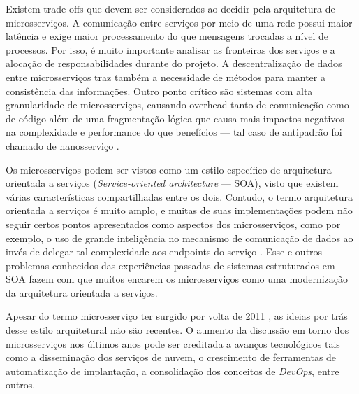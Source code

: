 Existem trade-offs que devem ser considerados ao decidir pela arquitetura de microsserviços. A comunicação entre serviços por meio de uma rede possui maior latência e exige maior processamento do que mensagens trocadas a nível de processos. Por isso, é muito importante analisar as fronteiras dos serviços e a alocação de responsabilidades durante do projeto. A descentralização de dados entre microsserviços traz também a necessidade de métodos para manter a consistência das informações. Outro ponto crítico são sistemas com alta granularidade de microsserviços, causando overhead tanto de comunicação como de código além de uma fragmentação lógica que causa mais impactos negativos na complexidade e performance do que benefícios --- tal caso de antipadrão foi chamado de nanosserviço \cite{rotem}.

Os microsserviços podem ser vistos como um estilo específico de arquitetura orientada a serviços (\textit{Service-oriented architecture} --- SOA), visto que existem várias características compartilhadas entre os dois. Contudo, o termo arquitetura orientada a serviços é muito amplo, e muitas de suas implementações podem não seguir certos pontos apresentados como aspectos dos microsserviços, como por exemplo, o uso de grande inteligência no mecanismo de comunicação de dados ao invés de delegar tal complexidade aos endpoints do serviço \cite{james}. Esse e outros problemas conhecidos das experiências passadas de sistemas estruturados em SOA fazem com que muitos encarem os microsserviços como uma modernização da arquitetura orientada a serviços.

Apesar do termo microsserviço ter surgido por volta de 2011 \cite{james}, as ideias por trás desse estilo arquitetural não são recentes. O aumento da discussão em torno dos microsserviços nos últimos anos pode ser creditada a avanços tecnológicos tais como a disseminação dos serviços de nuvem, o crescimento de ferramentas de automatização de implantação, a consolidação dos conceitos de \emph{DevOps}, entre outros.
